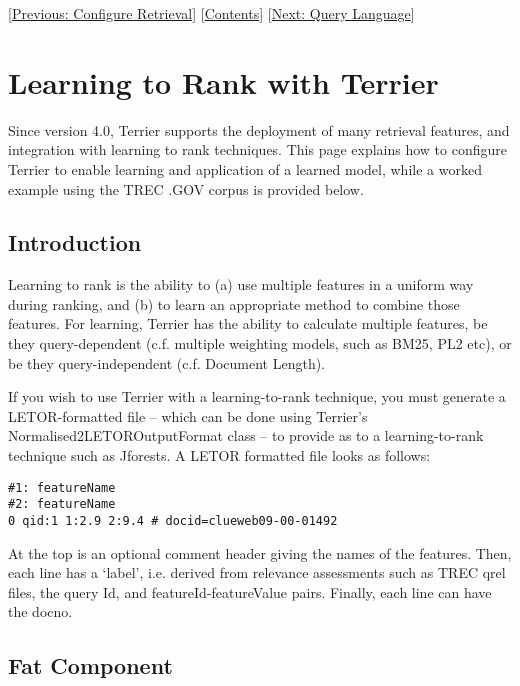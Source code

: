 {[}\href{configure_retrieval.html}{Previous: Configure Retrieval}{]}
{[}\href{index.html}{Contents}{]} {[}\href{querylanguage.html}{Next:
Query Language}{]}\\[2\baselineskip]

\section{Learning to Rank with
Terrier}\label{learning-to-rank-with-terrier}

Since version 4.0, Terrier supports the deployment of many retrieval
features, and integration with learning to rank techniques. This page
explains how to configure Terrier to enable learning and application of
a learned model, while a worked example using the TREC .GOV corpus is
provided below.

\subsection{Introduction}\label{introduction}

Learning to rank is the ability to (a) use multiple features in a
uniform way during ranking, and (b) to learn an appropriate method to
combine those features. For learning, Terrier has the ability to
calculate multiple features, be they query-dependent (c.f. multiple
weighting models, such as BM25, PL2 etc), or be they query-independent
(c.f. Document Length).

If you wish to use Terrier with a learning-to-rank technique, you must
generate a LETOR-formatted file -- which can be done using Terrier's
Normalised2LETOROutputFormat class -- to provide as to a
learning-to-rank technique such as Jforests. A LETOR formatted file
looks as follows:

\begin{verbatim}
#1: featureName
#2: featureName
0 qid:1 1:2.9 2:9.4 # docid=clueweb09-00-01492
\end{verbatim}

At the top is an optional comment header giving the names of the
features. Then, each line has a `label', i.e. derived from relevance
assessments such as TREC qrel files, the query Id, and
featureId-featureValue pairs. Finally, each line can have the docno.

\subsection{Fat Component}\label{fat-component}

